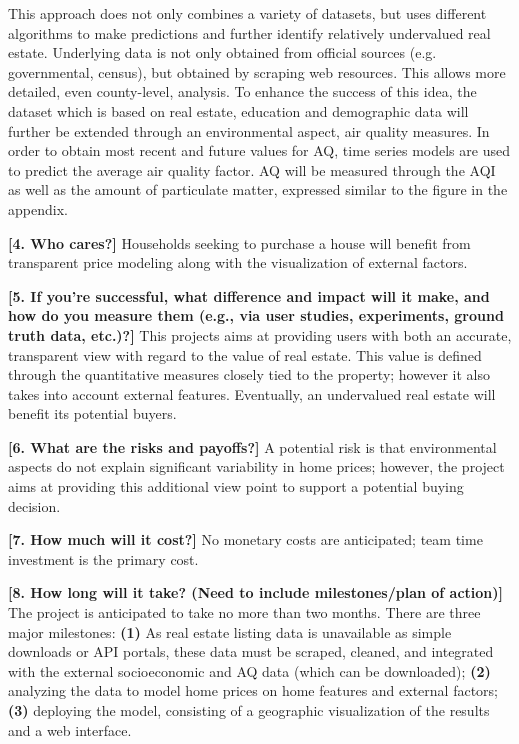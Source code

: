 \documentclass[sigconf,nonacm,11pt]{acmart}
\begin{document}
This approach does not only combines a variety of datasets, but uses different algorithms to make predictions and further identify relatively undervalued real estate. Underlying data is not only obtained from official sources (e.g. governmental, census), but obtained by scraping web resources. This allows more detailed, even county-level, analysis. To enhance the success of this idea, the dataset which is based on real estate, education and demographic data will further be extended through an environmental aspect, air quality measures. In order to obtain most recent and future values for AQ, time series models are used to predict the average air quality factor.
AQ will be measured through the AQI as well as the amount of particulate matter, expressed similar to the figure in the appendix.

\textbf{[4. Who cares?]}
Households seeking to purchase a house will benefit from transparent price modeling along with the visualization of external factors.

\textbf{[5. If you're successful, what difference and impact will it make, and how do you measure them (e.g., via user studies, experiments, ground truth data, etc.)?]}
This projects aims at providing users with both an accurate, transparent view with regard to the value of real estate. This value is defined through the quantitative measures closely tied to the property; however it also takes into account external features. Eventually, an undervalued real estate will benefit its potential buyers.

\textbf{[6. What are the risks and payoffs?]}
A potential risk is that environmental aspects do not explain significant variability in home prices; however, the project aims at providing this additional view point to support a potential buying decision.

\textbf{[7. How much will it cost?]}
No monetary costs are anticipated; team time investment is the primary cost.

\textbf{[8. How long will it take? (Need to include milestones/plan of action)]}
The project is anticipated to take no more than two months. There are three major milestones: \textbf{(1)} As real estate listing data is unavailable as simple downloads or API portals, these data must be scraped, cleaned, and integrated with the external socioeconomic and AQ data (which can be downloaded); \textbf{(2)} analyzing the data to model home prices on home features and external factors; \textbf{(3)} deploying the model, consisting of a geographic visualization of the results and a web interface.
\end{document}
